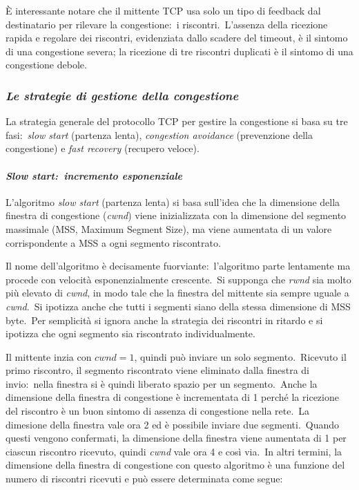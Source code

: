 È interessante notare che il mittente TCP usa solo un tipo di feedback dal destinatario per rilevare la congestione:\ i riscontri.\
L'assenza della ricezione rapida e regolare dei riscontri, evidenziata dallo scadere del timeout, è il sintomo di una congestione severa; la ricezione di tre riscontri duplicati è il sintomo di una congestione debole.

\subsubsection{\emph{Le strategie di gestione della congestione}}

La strategia generale del protocollo TCP per gestire la congestione si basa su tre fasi:\ \emph{slow start} (partenza lenta), \emph{congestion avoidance} (prevenzione della congestione) e \emph{fast recovery} (recupero veloce).

\paragraph{\emph{Slow start:\ incremento esponenziale}}

L'algoritmo \emph{slow start} (partenza lenta) si basa sull'idea che la dimensione della finestra di congestione (\emph{cwnd}) viene inizializzata con la dimensione del segmento massimale (MSS, Maximum Segment Size), ma viene aumentata di un valore corrispondente a MSS a ogni segmento riscontrato.

Il nome dell'algoritmo è decisamente fuorviante:\ l'algoritmo parte lentamente ma procede con velocità esponenzialmente crescente.\
Si supponga che \emph{rwnd} sia molto più elevato di \emph{cwnd}, in modo tale che la finestra del mittente sia sempre uguale a \emph{cwnd}.\
Si ipotizza anche che tutti i segmenti siano della stessa dimensione di MSS byte.\
Per semplicità si ignora anche la strategia dei riscontri in ritardo e si ipotizza che ogni segmento sia riscontrato individualmente.

Il mittente inzia con $cwnd = 1$, quindi può inviare un solo segmento.\
Ricevuto il primo riscontro, il segmento riscontrato viene eliminato dalla finestra di invio:\ nella finestra si è quindi liberato spazio per un segmento.\
Anche la dimensione della finestra di congestione è incrementata di 1 perché la ricezione del riscontro è un buon sintomo di assenza di congestione nella rete.\
La dimesione della finestra vale ora 2 ed è possibile inviare due segmenti.\
Quando questi vengono confermati, la dimensione della finestra viene aumentata di 1 per ciascun riscontro ricevuto, quindi \emph{cwnd} vale ora 4 e così via.\
In altri termini, la dimensione della finestra di congestione con questo algoritmo è una funzione del numero di riscontri ricevuti e può essere determinata come segue:


